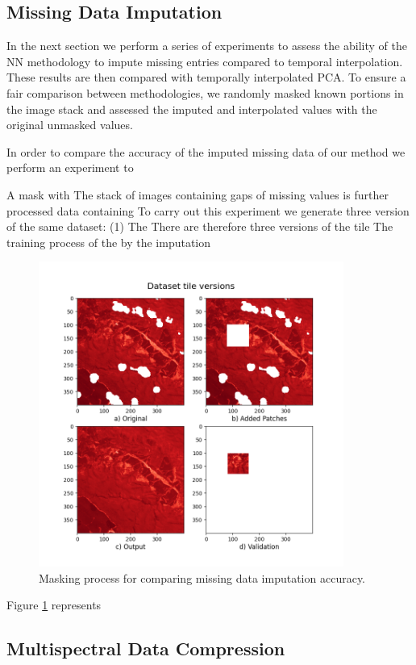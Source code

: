 \documentclass[essd, manuscript]{copernicus}
\begin{document}
\subsection{Missing Data Imputation}

In the next section we perform a series of experiments to assess the ability of the NN methodology to impute missing entries compared to temporal interpolation. These results are then compared with temporally interpolated PCA. To ensure a fair comparison between methodologies, we randomly masked known portions in the image stack and assessed the imputed and interpolated values with the original unmasked values.

In order to compare the accuracy of the imputed missing data of our method we perform an experiment to 

A mask with 
The stack of images containing gaps of missing values is further processed data containing 
To carry out this experiment we generate three version of the same dataset: (1) The 
There are therefore three versions of the tile 
The training process of the 
by the imputation 

\begin{figure}%
    \includegraphics[width=10cm]{fig5.png}
    \caption{Masking process for comparing missing data imputation accuracy.}%
    \label{dataset_versions}%
\end{figure}

Figure \ref{dataset_versions} represents 

\subsection{Multispectral Data Compression}
\end{document}
